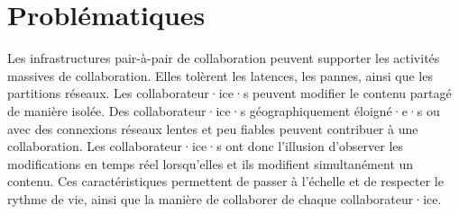 
\chapter{Problématiques}\label{ch:problematic}

\minitoc{}
\bigskip



Les infrastructures pair-à-pair de collaboration peuvent supporter les activités massives de collaboration.
Elles tolèrent les latences, les pannes, ainsi que les partitions réseaux.
Les collaborateur·ice·s peuvent modifier le contenu partagé de manière isolée.
Des collaborateur·ice·s géographiquement éloigné·e·s ou avec des connexions réseaux lentes et peu fiables peuvent contribuer à une collaboration.
Les collaborateur·ice·s ont donc l'illusion d'observer les modifications en temps réel lorsqu'elles et ils modifient simultanément un contenu.
Ces caractéristiques permettent de passer à l'échelle et de respecter le rythme de vie, ainsi que la manière de collaborer de chaque collaborateur·ice.

